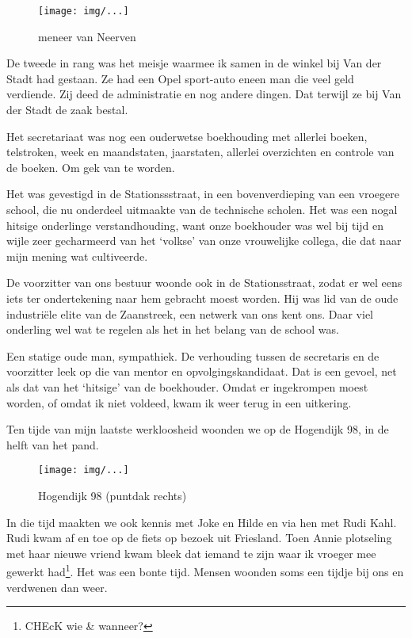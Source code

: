 \documentclass[10pt,twoside,openright]{memoir}
\begin{document}
\begin{figure}[t]
\texttt{[image: img/...]}
\caption{meneer van Neerven}
\end{figure}

De tweede in rang was het meisje waarmee ik samen in de winkel bij Van der Stadt had gestaan. Ze had een Opel sport-auto eneen man die veel geld verdiende. Zij deed de administratie en nog andere dingen. Dat terwijl ze bij Van der Stadt de zaak bestal.

Het secretariaat was nog een ouderwetse boekhouding met allerlei boeken, telstroken, week en maandstaten, jaarstaten, allerlei overzichten en controle van de boeken. Om gek van te worden. 

Het was gevestigd in de Stationssstraat, in een bovenverdieping van een vroegere school, die nu onderdeel uitmaakte van de technische scholen. Het was een nogal hitsige onderlinge verstandhouding, want onze boekhouder was wel bij tijd en wijle zeer gecharmeerd van het `volkse' van onze vrouwelijke collega, die dat naar mijn mening wat cultiveerde. 

De voorzitter van ons bestuur woonde ook in de Stationsstraat, zodat er wel eens iets ter ondertekening naar hem gebracht moest worden. Hij was lid van de oude industriële elite van de Zaanstreek, een netwerk van ons kent ons. Daar viel onderling wel wat te regelen als het in het belang van de school was. 

Een statige oude man, sympathiek. De verhouding tussen de secretaris en de voorzitter leek op die van mentor en opvolgingskandidaat. Dat is een gevoel, net als dat van het `hitsige' van de boekhouder. Omdat er ingekrompen moest worden, of omdat ik niet voldeed, kwam ik weer terug in een uitkering.

Ten tijde van mijn laatste werkloosheid woonden we op de Hogendijk 98, in de helft van het pand.

\begin{figure}[t]
\texttt{[image: img/...]}
\caption{Hogendijk 98 (puntdak rechts)}
\end{figure}

In die tijd maakten we ook kennis met Joke en Hilde en via hen met Rudi Kahl. Rudi kwam af en toe op de fiets op bezoek uit Friesland. Toen Annie plotseling met haar nieuwe vriend kwam bleek dat iemand te zijn waar ik vroeger mee gewerkt had\footnote{CHEcK wie & wanneer?}. Het was een bonte tijd. Mensen woonden soms een tijdje bij ons en verdwenen dan weer. 
\end{document}
